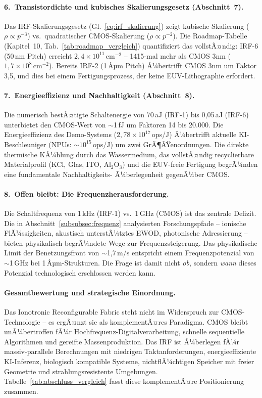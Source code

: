 ﻿\documentclass[a4paper,12pt]{scrreprt}
\theoremstyle{definition}
\begin{document}
\paragraph{6.~Transistordichte und kubisches Skalierungsgesetz (Abschnitt~7).}
Das IRF-Skalierungsgesetz (Gl.~\ref{eq:irf_skalierung}) zeigt
kubische Skalierung ($\rho \propto p^{-3}$) vs.\ quadratischer
CMOS-Skalierung ($\rho \propto p^{-2}$). Die Roadmap-Tabelle
(Kapitel~10, Tab.~\ref{tab:roadmap_vergleich}) quantifiziert das
vollstÃ¤ndig: IRF-6 (50\,nm Pitch) erreicht $2{,}4 \times 10^{11}$\,cm$^{-2}$ --
1415-mal mehr als CMOS 3nm ($1{,}7 \times 10^8$\,cm$^{-2}$). Bereits
IRF-2 (1\,Âµm Pitch) Ã¼bertrifft CMOS 3nm um Faktor 3,5, und dies
bei einem Fertigungsprozess, der keine EUV-Lithographie erfordert.

\paragraph{7.~Energieeffizienz und Nachhaltigkeit (Abschnitt~8).}
Die numerisch bestÃ¤tigte Schaltenergie von 70\,aJ (IRF-1) bis
0,05\,aJ (IRF-6) unterbietet den CMOS-Wert von $\sim$1\,fJ
um Faktoren 14 bis 20.000. Die Energieeffizienz des Demo-Systems
($2{,}78 \times 10^{17}$\,ops/J) Ã¼bertrifft aktuelle KI-Beschleuniger
(NPUs: $\sim 10^{15}$\,ops/J) um zwei GrÃ¶ÃŸenordnungen. Die direkte
thermische KÃ¼hlung durch das Wassermedium, das vollstÃ¤ndig
recyclierbare Materialprofil (KCl, Glas, ITO, Al$_2$O$_3$) und
die EUV-freie Fertigung begrÃ¼nden eine fundamentale Nachhaltigkeits-
Ã¼berlegenheit gegenÃ¼ber CMOS.

\paragraph{8.~Offen bleibt: Die Frequenzherausforderung.}
Die Schaltfrequenz von 1\,kHz (IRF-1) vs.\ 1\,GHz (CMOS) ist
das zentrale Defizit. Die in Abschnitt~\ref{subsubsec:frequenz}
analysierten Forschungspfade -- ionische FlÃ¼ssigkeiten, akustisch
unterstÃ¼tztes EWOD, photonische Adressierung -- bieten physikalisch
begrÃ¼ndete Wege zur Frequenzsteigerung. Das physikalische Limit der
Benetzungsfront von $\sim$1,7\,m/s entspricht einem Frequenzpotenzial
von $\sim$1\,GHz bei 1\,Âµm-Strukturen. Die Frage ist damit nicht
\emph{ob}, sondern \emph{wann} dieses Potenzial technologisch
erschlossen werden kann.

\paragraph{Gesamtbewertung und strategische Einordnung.}
Das Ionotronic Reconfigurable Fabric steht nicht im Widerspruch
zur CMOS-Technologie -- es ergÃ¤nzt sie als komplementÃ¤res Paradigma.
CMOS bleibt unÃ¼bertroffen fÃ¼r Hochfrequenz-Digitalverarbeitung,
schnelle sequentielle Algorithmen und gereifte Massenproduktion.
Das IRF ist Ã¼berlegen fÃ¼r massiv-parallele Berechnungen mit niedrigen
Taktanforderungen, energieeffiziente KI-Inferenz, biologisch
kompatible Systeme, nichtflÃ¼chtigen Speicher mit freier
Geometrie und strahlungsresistente Umgebungen. Tabelle~\ref{tab:abschluss_vergleich}
fasst diese komplementÃ¤re Positionierung zusammen.
\end{document}
